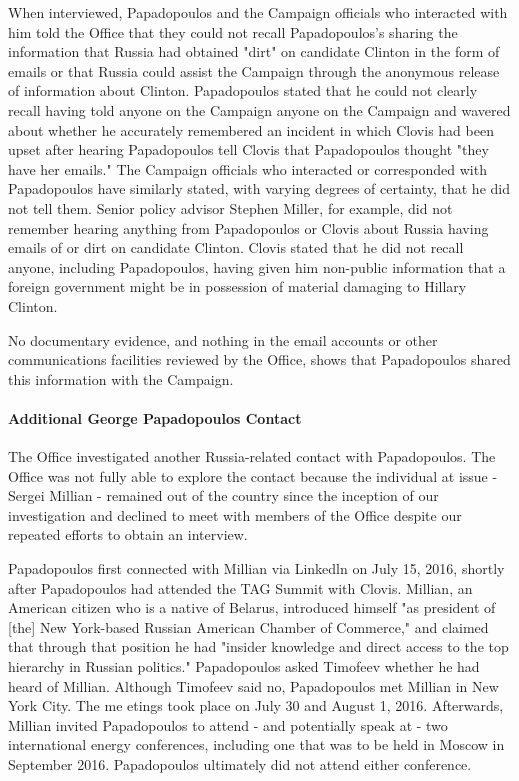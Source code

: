 When interviewed, Papadopoulos and the Campaign officials who interacted with him told the Office that they could not recall Papadopoulos's sharing the information that Russia had obtained "dirt" on candidate Clinton in the form of emails or that Russia could assist the Campaign through the anonymous release of information about Clinton.
Papadopoulos stated that he could not clearly recall having told anyone on the Campaign anyone on the Campaign and wavered about whether he accurately remembered an incident in which Clovis had been upset after hearing Papadopoulos tell Clovis that Papadopoulos thought "they have her emails."%
The Campaign officials who interacted or corresponded with Papadopoulos have similarly stated, with varying degrees of certainty, that he did not tell them.
Senior policy advisor Stephen Miller, for example, did not remember hearing anything from Papadopoulos or Clovis about Russia having emails of or dirt on candidate Clinton.%
Clovis stated that he did not recall anyone, including Papadopoulos, having given him non-public information that a foreign government might be in possession of material damaging to Hillary Clinton.%


No documentary evidence, and nothing in the email accounts or other communications facilities reviewed by the Office, shows that Papadopoulos shared this information with the Campaign.

\paragraph{Additional George Papadopoulos Contact}

The Office investigated another Russia-related contact with Papadopoulos.
The Office was not fully able to explore the contact because the individual at issue - Sergei Millian - remained out of the country since the inception of our investigation and declined to meet with members of the Office despite our repeated efforts to obtain an interview.

Papadopoulos first connected with Millian via Linkedln on July 15, 2016, shortly after Papadopoulos had attended the TAG Summit with Clovis.%
Millian, an American citizen who is a native of Belarus, introduced himself "as president of [the] New York-based Russian American Chamber of Commerce," and claimed that through that position he had "insider knowledge and direct access to the top hierarchy in Russian politics."%
Papadopoulos asked Timofeev whether he had heard of Millian.%
Although Timofeev said no,%
Papadopoulos met Millian in New York City.%
The me etings took place on July 30 and August 1, 2016.%
Afterwards, Millian invited Papadopoulos to attend - and potentially speak at - two international energy conferences, including one that was to be held in Moscow in September 2016.%
Papadopoulos ultimately did not attend either conference.


